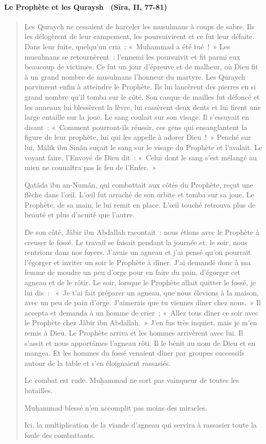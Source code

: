 \paragraph{Le Prophète et les Quraysh~ (Sīra, II,
77-81)}
\begin{quote}

{Les Quraych ne cessaient de harceler les musulmans à coups de
sabre. Ils les délogèrent de leur campement, les poursuivirent et ce fut
leur défaite. Dans leur fuite, quelqu'un cria~: «~Muhammad a été tué~!~»
Les musulmans se retournèrent~: l'ennemi les poursuivit et fit parmi eux
beaucoup de victimes. Ce fut un jour d'épreuve et de malheur, où Dieu
fit à un grand nombre de musulmans l'honneur du martyre. Les Quraych
parvinrent enfin à atteindre le Prophète. Ils lui lancèrent des pierres
en si grand nombre qu'il tomba sur le côté. Son casque de mailles fut
défoncé et les anneaux lui blessèrent la lèvre, lui cassèrent deux dents
et lui firent une large entaille sur la joue. Le sang coulait sur son
visage. Il s'essuyait en disant~: «~Comment pourront-ils réussir, ces
gens qui ensanglantent la figure de leur prophète, lui qui les appelle à
adorer Dieu~!~» Penché sur lui, Mâlik ibn Sinân suçait le sang sur le
visage du Prophète et l'avalait. Le voyant faire, l'Envoyé de Dieu dit~:
«~Celui dont le sang s'est mélangé au mien ne connaîtra pas le feu de
l'Enfer.~»}

{Qatâda ibn an-Numân, qui combattait aux côtés du Prophète,
reçut une flèche dans l'œil. L'œil fut arraché de son orbite et tomba
sur sa joue. Le Prophète, de sa main, le lui remit en place. L'œil
touché retrouva plus de beauté et plus d'acuité que l'autre.}

{De son côté, Jâbir ibn Abdallah racontait~: nous étions avec le
Prophète à creuser le fossé. Le travail se faisait pendant la journée
et, le soir, nous rentrions dans nos foyers. J'avais un agneau et j'ai
pensé qu'on pourrait l'égorger et inviter un soir le Prophète à dîner.
J'ai demandé donc à ma femme de moudre un peu d'orge pour en faire du
pain, d'égorger cet agneau et de le rôtir. Le soir, lorsque le Prophète
allait quitter le fossé, je lui dis~:~ «~Je t'ai fait préparer un
agneau, que nous élevions à la maison, avec un peu de pain d'orge.
J'aimerais que tu viennes dîner chez nous.~» Il accepta et demanda à un
homme de crier~; «~Allez tous dîner ce soir avec le Prophète chez Jâbir
ibn Abdallah.~» J'en fus très inquiet, mais je m'en remis à Dieu. Le
Prophète arriva et les hommes arrivèrent avec lui. Il s'assit et nous
apportâmes l'agneau rôti. Il le bénit au nom de Dieu et en mangea. Et
les hommes du fossé venaient dîner par groupes successifs autour de la
table et s'en éloignaient rassasiés.}

Le combat est rude. Muḥammad ne sort pas vainqueur de toutes les
batailles.

Muḥammad blessé n'en accomplit pas moins des miracles.

Ici, la multiplication de la viande d'agneau qui servira à rassasier
toute la foule des combattants.
    
\end{quote}

